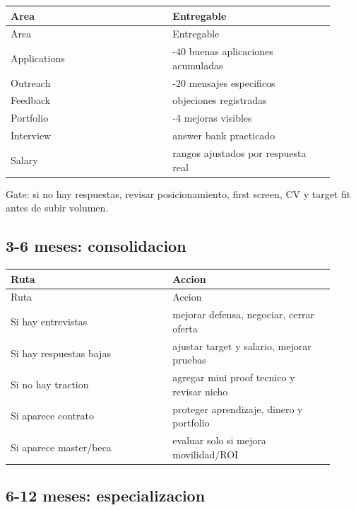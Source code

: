 \begin{center}
\scriptsize
\begin{longtable}{>{\raggedright\arraybackslash}p{0.455\linewidth} >{\raggedright\arraybackslash}p{0.455\linewidth}}
\toprule
Area & Entregable \\
\midrule
\endfirsthead
\toprule
Area & Entregable \\
\midrule
\endhead
Applications & 20-40 buenas aplicaciones acumuladas \\
Outreach & 10-20 mensajes especificos \\
Feedback & objeciones registradas \\
Portfolio & 2-4 mejoras visibles \\
Interview & answer bank practicado \\
Salary & rangos ajustados por respuesta real \\
\bottomrule
\end{longtable}
\end{center}


Gate: si no hay respuestas, revisar posicionamiento, first screen, CV y target fit antes de subir volumen.


\subsection{3-6 meses: consolidacion}


\begin{center}
\scriptsize
\begin{longtable}{>{\raggedright\arraybackslash}p{0.455\linewidth} >{\raggedright\arraybackslash}p{0.455\linewidth}}
\toprule
Ruta & Accion \\
\midrule
\endfirsthead
\toprule
Ruta & Accion \\
\midrule
\endhead
Si hay entrevistas & mejorar defensa, negociar, cerrar oferta \\
Si hay respuestas bajas & ajustar target y salario, mejorar pruebas \\
Si no hay traction & agregar mini proof tecnico y revisar nicho \\
Si aparece contrato & proteger aprendizaje, dinero y portfolio \\
Si aparece master/beca & evaluar solo si mejora movilidad/ROI \\
\bottomrule
\end{longtable}
\end{center}


\subsection{6-12 meses: especializacion}



